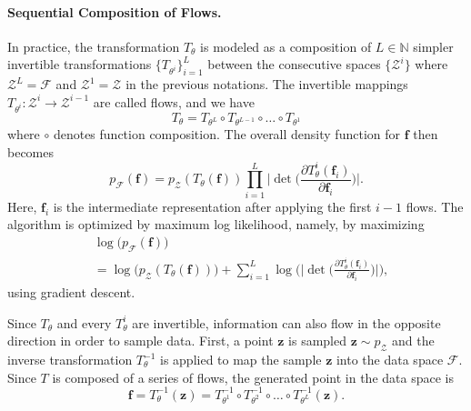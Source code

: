 \documentclass{article}
\theoremstyle{plain}
\theoremstyle{definition}
\theoremstyle{remark}
\begin{document}
\paragraph{Sequential Composition of Flows.}

In practice, the transformation $T_\theta$ is modeled as a composition of $L\in \mathbb{N}$ simpler invertible transformations $\{T_{\theta^i}\}_{i=1}^L$ between the consecutive spaces $\{\mathcal{Z}^i\}$ where $\mathcal{Z}^L = \mathcal{F} $ and $\mathcal{Z}^1 = \mathcal{Z}$ in the previous notations. The invertible mappings $T_{\theta^i}: \mathcal{Z}^i \rightarrow \mathcal{Z}^{i-1}$ are called flows, and we have 
\[T_\theta = T_{\theta^L} \circ T_{\theta^{L-1}} \circ \dots \circ T_{\theta^1}\]
where $\circ$ denotes function composition. The overall density function for $\mathbf{f}$ then becomes
\[p_\mathcal{F}(\mathbf{f}) = p_\mathcal{Z}(T_\theta(\mathbf{f}))\prod_{i=1}^{L} \bigg| \det \bigg( \frac{\partial T_\theta^i (\mathbf{f}_i)}{\partial  \mathbf{f}_i}  \bigg) \bigg|. \]
Here, $\mathbf{f}_i$ is the intermediate representation after applying the first $i-1$ flows.  
%
The algorithm is optimized by maximum log likelihood, namely, by maximizing
\begin{align*}
    & \log\big(p_\mathcal{F}(\mathbf{f})\big) \\
    & = \log\big(p_\mathcal{Z}(T_\theta(\mathbf{f}))\big) + \sum_{i=1}^{L} \log\Bigg(\bigg| \det \bigg( \frac{\partial T_\theta^i (\mathbf{f}_i)}{\partial  \mathbf{f}_i}  \bigg) \bigg|\Bigg), 
\end{align*}
using gradient descent.

Since $T_\theta$ and every $T_\theta^i$ are invertible, information can also flow in the opposite direction in order to sample data. First, a point $\mathbf{z}$ is sampled $\mathbf{z} \sim p_\mathcal{Z}$ and the inverse transformation $T_\theta^{-1}$ is applied to map the sample $\mathbf{z}$ into the data space $\mathcal{F}$. Since $T$ is composed of a series of flows, the generated point in the data space is 
\[\mathbf{f} = T_\theta^{-1}(\mathbf{z}) = T_{\theta^1}^{-1} \circ T_{\theta^2}^{-1} \circ \dots \circ T_{\theta^L}^{-1}(\mathbf{z}).\]
\end{document}
